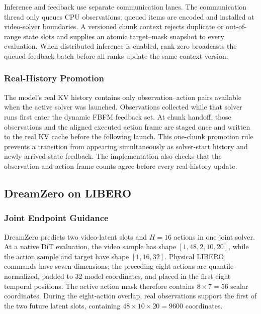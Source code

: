 Inference and feedback use separate communication lanes. The communication
thread only queues CPU observations; queued items are encoded and installed at
video-solver boundaries. A versioned chunk context rejects duplicate or
out-of-range state slots and supplies an atomic target--mask snapshot to every
evaluation. When distributed inference is enabled, rank zero broadcasts the
queued feedback batch before all ranks update the same context version.

\subsubsection{Real-History Promotion}

The model's real KV history contains only observation--action pairs available
when the active solver was launched. Observations collected while that solver
runs first enter the dynamic FBFM feedback set. At chunk handoff, those
observations and the aligned executed action frame are staged once and written
to the real KV cache before the following launch. This one-chunk promotion rule
prevents a transition from appearing simultaneously as solver-start history
and newly arrived state feedback. The implementation also checks that the
observation and action frame counts agree before every real-history update.

\subsection{DreamZero on LIBERO}

\subsubsection{Joint Endpoint Guidance}

DreamZero predicts two video-latent slots and $H=16$ actions in one joint
solver. At a native DiT evaluation, the video sample has shape
$[1,48,2,10,20]$, while the action sample and target have shape $[1,16,32]$.
Physical LIBERO commands have seven dimensions; the preceding eight actions
are quantile-normalized, padded to 32 model coordinates, and placed in the
first eight temporal positions. The active action mask therefore contains
$8\times7=56$ scalar coordinates. During the eight-action overlap, real
observations support the first of the two future latent slots, containing
$48\times10\times20=9600$ coordinates.

